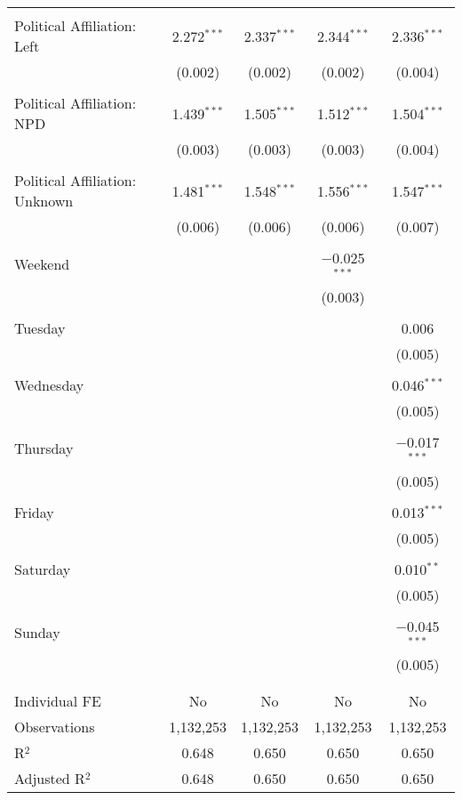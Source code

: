 \documentclass[
]{article}
\begin{document}
\begin{table}[!htbp]
{\begin{tabular}{@{\extracolsep{5pt}}lcccc}
  & & & & \\ 
 Political Affiliation: Left & 2.272$^{***}$ & 2.337$^{***}$ & 2.344$^{***}$ & 2.336$^{***}$ \\ 
  & (0.002) & (0.002) & (0.002) & (0.004) \\ 
  & & & & \\ 
 Political Affiliation: NPD & 1.439$^{***}$ & 1.505$^{***}$ & 1.512$^{***}$ & 1.504$^{***}$ \\ 
  & (0.003) & (0.003) & (0.003) & (0.004) \\ 
  & & & & \\ 
 Political Affiliation: Unknown & 1.481$^{***}$ & 1.548$^{***}$ & 1.556$^{***}$ & 1.547$^{***}$ \\ 
  & (0.006) & (0.006) & (0.006) & (0.007) \\ 
  & & & & \\ 
 Weekend &  &  & $-$0.025$^{***}$ &  \\ 
  &  &  & (0.003) &  \\ 
  & & & & \\ 
 Tuesday &  &  &  & 0.006 \\ 
  &  &  &  & (0.005) \\ 
  & & & & \\ 
 Wednesday &  &  &  & 0.046$^{***}$ \\ 
  &  &  &  & (0.005) \\ 
  & & & & \\ 
 Thursday &  &  &  & $-$0.017$^{***}$ \\ 
  &  &  &  & (0.005) \\ 
  & & & & \\ 
 Friday &  &  &  & 0.013$^{***}$ \\ 
  &  &  &  & (0.005) \\ 
  & & & & \\ 
 Saturday &  &  &  & 0.010$^{**}$ \\ 
  &  &  &  & (0.005) \\ 
  & & & & \\ 
 Sunday &  &  &  & $-$0.045$^{***}$ \\ 
  &  &  &  & (0.005) \\ 
  & & & & \\ 
\hline \\[-1.8ex] 
Individual FE & No & No & No & No \\ 
Observations & 1,132,253 & 1,132,253 & 1,132,253 & 1,132,253 \\ 
R$^{2}$ & 0.648 & 0.650 & 0.650 & 0.650 \\ 
Adjusted R$^{2}$ & 0.648 & 0.650 & 0.650 & 0.650 \\ 

\end{tabular}}
\end{table}
\end{document}
